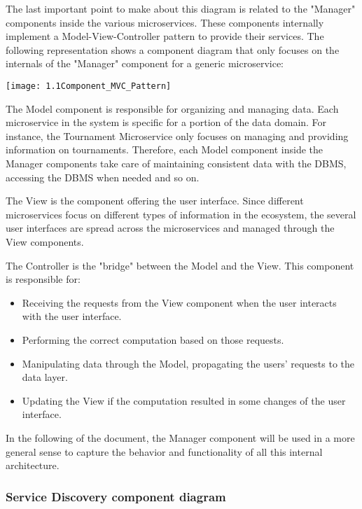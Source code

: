 The last important point to make about this diagram is related to the "Manager" components inside the various microservices. These components internally implement a Model-View-Controller pattern to provide their services. The following representation shows a component diagram that only focuses on the internals of the "Manager" component for a generic microservice:

\vspace{1cm}
\begin{center}
\texttt{[image: 1.1Component\_MVC\_Pattern]}
\end{center}

The Model component is responsible for organizing and managing data. Each microservice in the \app system is specific for a portion of the data domain. For instance, the Tournament Microservice only focuses on managing and providing information on tournaments. Therefore, each Model component inside the Manager components take care of maintaining consistent data with the DBMS, accessing the DBMS when needed and so on.

The View is the component offering the user interface. Since different microservices focus on different types of information in the \app ecosystem, the several user interfaces are spread across the microservices and managed through the View components.

The Controller is the "bridge" between the Model and the View. This component is responsible for:
\begin{itemize}
	\item Receiving the requests from the View component when the user interacts with the user interface. 
	\item Performing the correct computation based on those requests.
	\item Manipulating data through the Model, propagating the users' requests to the data layer.
	\item Updating the View if the computation resulted in some changes of the user interface.
\end{itemize}

In the following of the document, the Manager component will be used in a more general sense to capture the behavior and functionality of all this internal architecture.


\subsubsection{Service Discovery component diagram}

